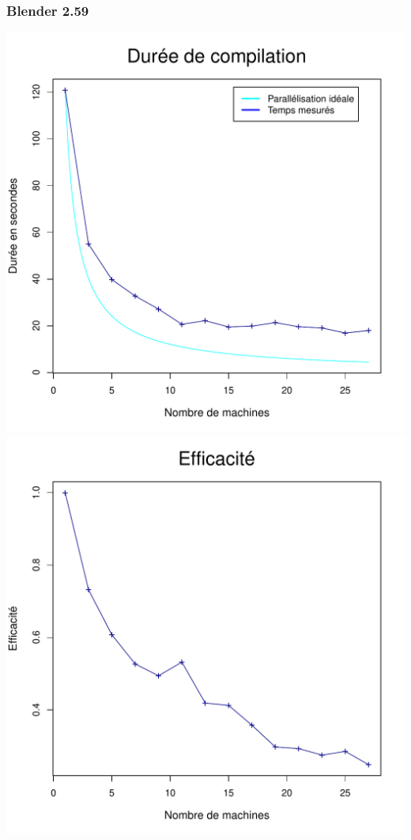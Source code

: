 \documentclass[a4paper, 11pt, titlepage]{article}
\begin{document}
\subsubsection {Blender 2.59}


\begin{center}
    \includegraphics[scale=0.45]{res/sujet_makefiles_blender_259_Makefile_nth1.pdf}
    \includegraphics[scale=0.45]{res/sujet_makefiles_blender_259_Makefile_nth1_eff.pdf}

\end{center}
\end{document}
